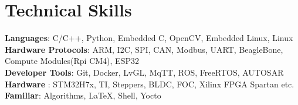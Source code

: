 \documentclass[letterpaper,11pt]{article}
\begin{document}
\section{Technical Skills}
 \begin{itemize}[leftmargin=0.15in, label={}]
    \small{\item{
     \textbf{Languages}{: C/C++, Python, Embedded C, OpenCV, Embedded Linux, Linux} \\
     \textbf{Hardware Protocols}{: ARM, I2C, SPI, CAN, Modbus, UART, BeagleBone, Compute Modules(Rpi CM4),  ESP32} \\
     \textbf{Developer Tools}{: Git, Docker, LvGL, MqTT, ROS, FreeRTOS, AUTOSAR} \\
     \textbf{Hardware }{: STM32H7x, TI, Steppers, BLDC, FOC, Xilinx FPGA Spartan etc.} \\
     \textbf{Familiar}{: Algorithms, \LaTeX, Shell, Yocto}
    }}
\end{itemize}\vspace{-20pt}



\end{document}
